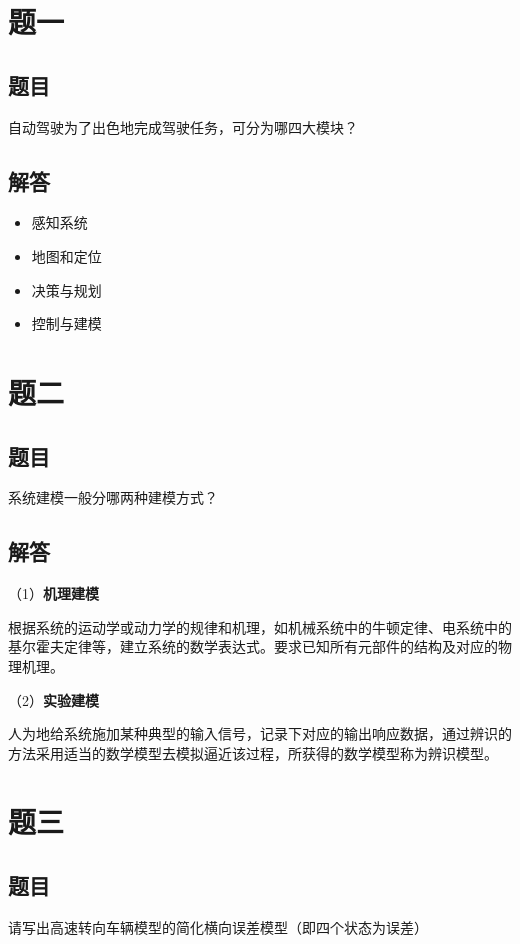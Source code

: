 \documentclass[UTF8]{ctexart}
\begin{document}

\section{题一}

  \subsection{题目}
  自动驾驶为了出色地完成驾驶任务，可分为哪四大模块？
  \subsection{解答}
  \begin{itemize}
    \item 感知系统
    \item 地图和定位
    \item 决策与规划
    \item 控制与建模
  \end{itemize}

\section{题二}

  \subsection{题目}
  系统建模一般分哪两种建模方式？
  \subsection{解答}
  \par （1）\textbf{机理建模}

  根据系统的运动学或动力学的规律和机理，如机械系统中的牛顿定律、电系统中的基尔霍夫定律等，建立系统的数学表达式。要求已知所有元部件的结构及对应的物理机理。
  \par （2）\textbf{实验建模}

  人为地给系统施加某种典型的输入信号，记录下对应的输出响应数据，通过辨识的方法采用适当的数学模型去模拟逼近该过程，所获得的数学模型称为辨识模型。

\section{题三}

  \subsection{题目}
  请写出高速转向车辆模型的简化横向误差模型（即四个状态为误差）
\end{document}
